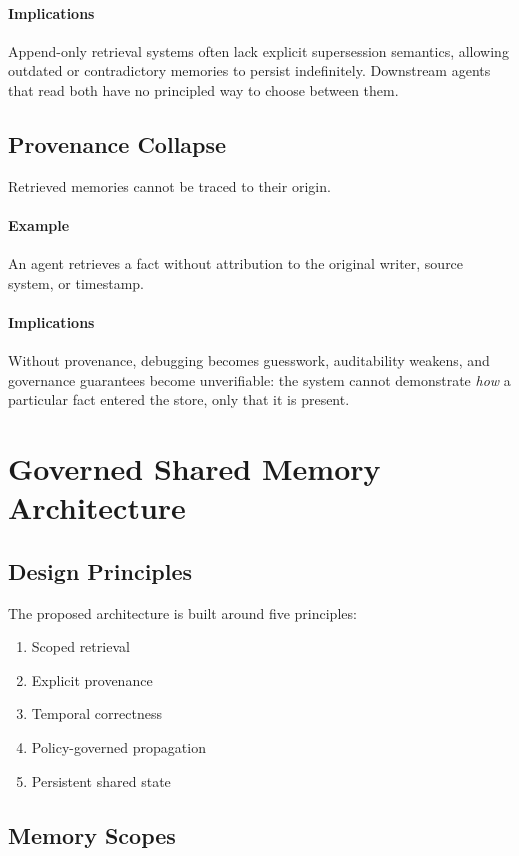 \documentclass[10pt,twocolumn,letterpaper]{article}
\begin{document}
\paragraph{Implications}
Append-only retrieval systems often lack explicit supersession semantics, allowing outdated or contradictory memories to persist indefinitely. Downstream agents that read both have no principled way to choose between them.

\subsection{Provenance Collapse}

Retrieved memories cannot be traced to their origin.

\paragraph{Example}
An agent retrieves a fact without attribution to the original writer, source system, or timestamp.

\paragraph{Implications}
Without provenance, debugging becomes guesswork, auditability weakens, and governance guarantees become unverifiable: the system cannot demonstrate \emph{how} a particular fact entered the store, only that it is present.

\section{Governed Shared Memory Architecture}

\subsection{Design Principles}

The proposed architecture is built around five principles:
\begin{enumerate}
    \item Scoped retrieval
    \item Explicit provenance
    \item Temporal correctness
    \item Policy-governed propagation
    \item Persistent shared state
\end{enumerate}

\subsection{Memory Scopes}
\end{document}
